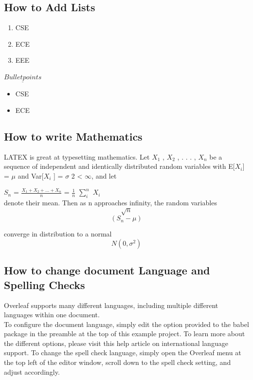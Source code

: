 \documentclass{article}
\begin{document}
	
	\subsection{How to Add Lists}
	
	\begin{enumerate}
		\item 
		CSE
		\item
		ECE
		\item EEE
	\end{enumerate}
$\underline{Bullet points}$
 \begin{itemize}
 	\item CSE
 	\item ECE
 \end{itemize}

\subsection{How to write Mathematics }
LATEX is great at typesetting mathematics. Let $X_{1}$ , $X_{2}$ , . . . , $X_{n}$ be a sequence of independent and
identically distributed random variables with E[$X_{i}$] = $\mu$ and Var[$X_{i}$ ] =  $\sigma$  2 < $\infty$, and let\\
\newline

$S_{n}$ = $\frac{ X_{1} + X_{2} + . . . + X_{n} }{n}$ = $\frac{1}{n}$ $\sum_{i}^{n}$ $X_{i}$ \\


denote their mean. Then as n approaches infinity, the random variables\\

	\[\sqrt{n}\] \[(S_{n} - \mu )\]

converge in distribution to a normal \[N(0,\sigma ^ 2)\]

\subsection{How to change document Language and Spelling Checks}
Overleaf supports many different languages, including multiple different languages within one document.\\

To configure the document language, simply edit the option provided to the babel package in the
preamble at the top of this example project. To learn more about the different options, please visit
this help article on international language support.
To change the spell check language, simply open the Overleaf menu at the top left of the editor
window, scroll down to the spell check setting, and adjust accordingly.
\end{document}
